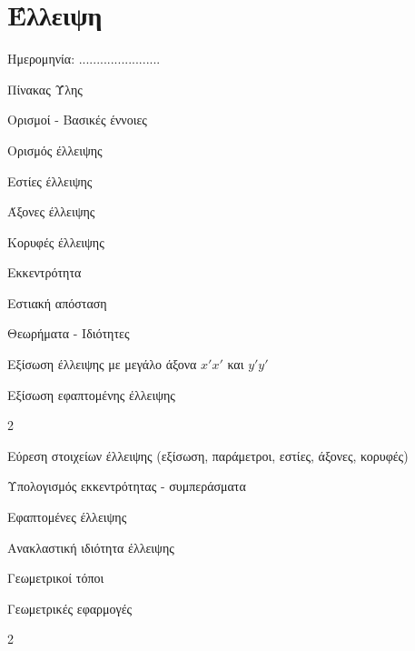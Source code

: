 \documentclass[twoside,nofonts,internet,math,spyros]{frontisthrio}
\newcommand{\myitem}{\stepcounter{enumi}\item[\raisebox{0.5mm}{\faEdit}\ \Large$\square$]}
\begin{document}
\section{Έλλειψη}
\begin{flushright}
\faCalendar* Ημερομηνία: .......................
\end{flushright}
\begin{mybox}[mysubtitle]{Πίνακας Ύλης}
\begin{tcbraster}[raster columns=2,raster equal height]
\begin{myleftbox}{Ορισμοί - Βασικές έννοιες\ \ \faBook}
\begin{arithmisi}[itemsep=0mm]
\item Ορισμός έλλειψης
\item Εστίες έλλειψης
\item Άξονες έλλειψης
\item Κορυφές έλλειψης
\item Εκκεντρότητα
\item Εστιακή απόσταση
\end{arithmisi}
\end{myleftbox}
\begin{myrightbox}{Θεωρήματα - Ιδιότητες\ \ \faTools}
\begin{arithmisi}[itemsep=0mm]
\item Εξίσωση έλλειψης με μεγάλο άξονα $x'x'$ και $y'y'$
\item Εξίσωση εφαπτομένης έλλειψης
\end{arithmisi}
\end{myrightbox}
\end{tcbraster}
\begin{multicols}{2}
\begin{todolist}[itemsep=0mm]
\myitem Εύρεση στοιχείων έλλειψης (εξίσωση, παράμετροι, εστίες, άξονες, κορυφές)
\item Υπολογισμός εκκεντρότητας - συμπεράσματα
\item Εφαπτομένες έλλειψης
\item Ανακλαστική ιδιότητα έλλειψης
\item Γεωμετρικοί τόποι
\item Γεωμετρικές εφαρμογές
\end{todolist}
\end{multicols}
\begin{multicols*}{2}
\begin{enumerate}[itemsep=0mm,leftmargin=5mm]

\end{enumerate}
\end{multicols*}
\end{mybox}
\end{document}

